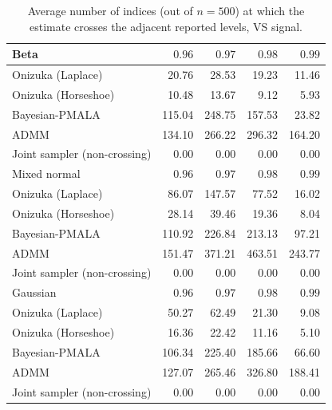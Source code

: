 \begin{table}[!htbp]
\centering
\small
\caption{Average number of indices (out of $n=500$) at which the estimate crosses the adjacent reported levels, VS signal.}
\label{tab:ext_vs_crossings_neighbor}
\begin{tabular}{lrrrr}
\toprule
Beta & $0.96$ & $0.97$ & $0.98$ & $0.99$ \\
\midrule
Onizuka (Laplace) & 20.76 & 28.53 & 19.23 & 11.46 \\
Onizuka (Horseshoe) & 10.48 & 13.67 & 9.12 & 5.93 \\
Bayesian-PMALA & 115.04 & 248.75 & 157.53 & 23.82 \\
ADMM & 134.10 & 266.22 & 296.32 & 164.20 \\
Joint sampler (non-crossing) & 0.00 & 0.00 & 0.00 & 0.00 \\
\midrule
Mixed normal & $0.96$ & $0.97$ & $0.98$ & $0.99$ \\
\midrule
Onizuka (Laplace) & 86.07 & 147.57 & 77.52 & 16.02 \\
Onizuka (Horseshoe) & 28.14 & 39.46 & 19.36 & 8.04 \\
Bayesian-PMALA & 110.92 & 226.84 & 213.13 & 97.21 \\
ADMM & 151.47 & 371.21 & 463.51 & 243.77 \\
Joint sampler (non-crossing) & 0.00 & 0.00 & 0.00 & 0.00 \\
\midrule
Gaussian & $0.96$ & $0.97$ & $0.98$ & $0.99$ \\
\midrule
Onizuka (Laplace) & 50.27 & 62.49 & 21.30 & 9.08 \\
Onizuka (Horseshoe) & 16.36 & 22.42 & 11.16 & 5.10 \\
Bayesian-PMALA & 106.34 & 225.40 & 185.66 & 66.60 \\
ADMM & 127.07 & 265.46 & 326.80 & 188.41 \\
Joint sampler (non-crossing) & 0.00 & 0.00 & 0.00 & 0.00 \\
\bottomrule
\end{tabular}
\end{table}

